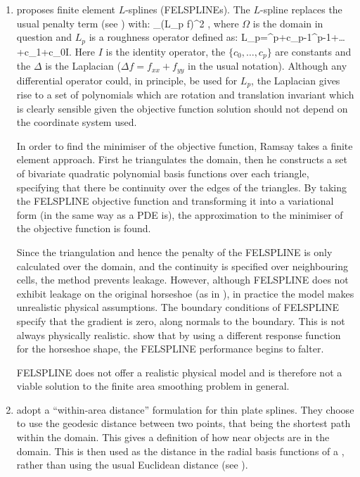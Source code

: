 \begin{enumerate}
\item {} proposes finite element $L$-splines (FELSPLINEs). The $L$-spline replaces the usual penalty term (see ) with:
\be
\int_\Omega (L_p f)^2 \Omega,
\ee
where $\Omega$ is the domain in question and $L_p$ is a roughness operator defined as:
\be
L_p=\Delta^p+c_{p-1}\Delta^{p-1}+\dots+c_1\Delta+c_0I.
\ee
Here $I$ is the identity operator, the $\{c_0,\dots, c_p\}$ are constants and the $\Delta$ is the Laplacian ($\Delta f = f_{xx}+f_{yy}$ in the usual notation). Although any differential operator could, in principle, be used for $L_p$, the Laplacian gives rise to a set of polynomials which are rotation and translation invariant which is clearly sensible given the objective function solution should not depend on the coordinate system used.

In order to find the minimiser of the objective function, Ramsay takes a finite element approach. First he triangulates the domain, then he constructs a set of bivariate quadratic polynomial basis functions over each triangle, specifying that there be continuity over the edges of the triangles. By taking the FELSPLINE objective function and transforming it into a variational form (in the same way as a PDE is), the approximation to the minimiser of the objective function is found. 

Since the triangulation and hence the penalty of the FELSPLINE is only calculated over the domain, and the continuity is specified over neighbouring cells, the method prevents leakage. However, although FELSPLINE does not exhibit leakage on the original horseshoe (as in ), in practice the model makes unrealistic physical assumptions. The boundary conditions of FELSPLINE specify that the gradient is zero, along normals to the boundary. This is not always physically realistic.  show that by using a different response function for the horseshoe shape, the FELSPLINE performance begins to falter.

FELSPLINE does not offer a realistic physical model and is therefore not a viable solution to the finite area smoothing problem in general.

\item {} adopt a ``within-area distance'' formulation for thin plate splines. They choose to use the geodesic distance between two points, that being the shortest path within the domain. This gives a definition of how near objects are in the domain. This is then used as the distance in the radial basis functions of a \tprs, rather than using the usual Euclidean distance (see ).


\end{enumerate}
